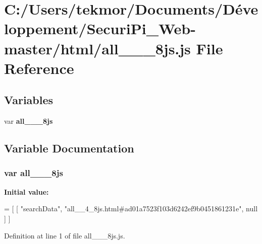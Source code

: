 \section{C\+:/\+Users/tekmor/\+Documents/\+Développement/\+Securi\+Pi\+\_\+\+Web-\/master/html/all\+\_\+\+\_\+\_\+8js.js File Reference}
\label{all____4__8js_8js}
\subsection*{Variables}
\begin{DoxyCompactItemize}
\item 
var {\bf all\+\_\+\+\_\+\_\+8js}
\end{DoxyCompactItemize}


\subsection{Variable Documentation}
\subsubsection[{all\+\_\+\+\_\+4\+\_\+8js}]{\setlength{\rightskip}{0pt plus 5cm}var all\+\_\+\+\_\+\_\+8js}\label{all____4__8js_8js_a30083cf1f4ed680db668ac5358fc60a1}
{\bfseries Initial value\+:}
\begin{DoxyCode}
=
[
    [ \textcolor{stringliteral}{"searchData"}, \textcolor{stringliteral}{"all\_\_4\_8js.html#ad01a7523f103d6242ef9b0451861231e"}, null ]
]
\end{DoxyCode}


Definition at line 1 of file all\+\_\+\+\_\+\_\+8js.\+js.

